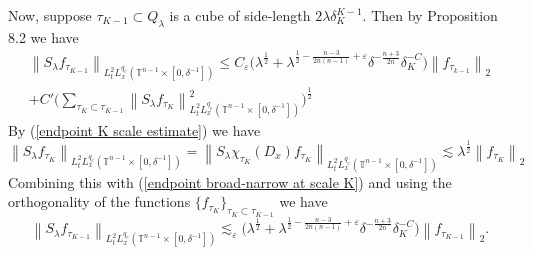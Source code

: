\documentclass[11pt]{amsart}
\numberwithin{equation}{section}
\newcommand{\Tn}{\mathbb{T}^{n-1}}
\newcommand{\la}{\lambda}
\newcommand\norm[1]{\left\lVert#1\right\rVert}
\newcommand{\altlpnorm}[2]{\norm{#1}_{#2}}
\newcommand{\mixlpnorm}[4]{\norm{#1}_{L^{#2}_{t} L^{#3}_{x}(#4)}}
\newcommand{\Sl}{S_{\la}}
\newcommand{\dK}[1]{\delta_{K}^{#1}}
\begin{document}
Now, suppose $\tau_{K-1} \subset Q_{\la}$ is a cube of side-length $2\la \dK{K-1}$. Then by Proposition 8.2 we have
\begin{equation} \label{endpoint broad-narrow at scale K}
\begin{split}
    \mixlpnorm{\Sl f_{\tau_{K-1}}}{2}{q_e}{\Tn\times[0, \delta^{-1}]} \leq C_{\varepsilon}\big(\la^{\frac{1}{2}} +  \la^{\frac{1}{2} - \frac{n-3}{2n(n-1)}+\varepsilon}\delta^{-\frac{n+3}{2n}}\dK{-C}\big)\altlpnorm{f_{\tau_{k-1}}}{2} \\
    + C'\Big(\sum_{\tau_{K} \subset \tau_{K-1}}\mixlpnorm{\Sl f_{\tau_{K}}}{2}{q_e}{\Tn \times [0, \delta^{-1}]}^{2}\Big)^{\frac{1}{2}}
\end{split}
\end{equation}
\noindent
By (\ref{endpoint K scale estimate}) we have
\begin{equation}\label{endpoint smallest scale Strichartz}
    \mixlpnorm{\Sl f_{\tau_{K}}}{2}{q_e}{\Tn \times [0, \delta^{-1}]} = \mixlpnorm{\Sl \chi_{\tau_{K}}(D_x)f_{\tau_{K}}}{2}{q_e}{\Tn \times [0, \delta^{-1}]}   \lesssim \la^{\frac{1}{2}}\altlpnorm{f_{\tau_{K}}}{2}
\end{equation}
Combining this with (\ref{endpoint broad-narrow at scale K}) and using the orthogonality of the functions $\{ f_{\tau_{K}}\}_{\tau_K \subset \tau_{K-1}}$ we have
\begin{equation}
    \mixlpnorm{\Sl f_{\tau_{K-1}}}{2}{q_e}{\Tn\times[0, \delta^{-1}]} \lesssim_{\varepsilon}\big(\la^{\frac{1}{2}} +  \la^{\frac{1}{2} - \frac{n-3}{2n(n-1)}+\varepsilon}\delta^{-\frac{n+3}{2n}}\dK{-C}\big)\altlpnorm{f_{\tau_{K-1}}}{2}.
\end{equation}
\end{document}
